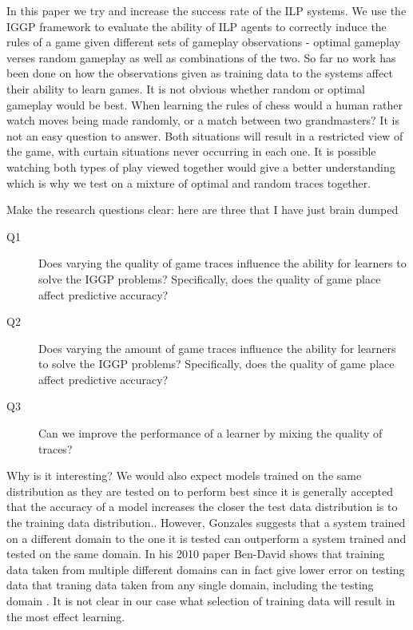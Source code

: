 In this paper we try and increase the success rate of the ILP systems. We use the IGGP framework to evaluate the ability of ILP agents to correctly induce the rules of a game given different sets of gameplay observations - optimal gameplay verses random gameplay as well as combinations of the two. So far no work has been done on how the observations given as training data to the systems affect their ability to learn games. It is not obvious whether random or optimal gameplay would be best. When learning the rules of chess would a human rather watch moves being made randomly, or a match between two grandmasters? It is not an easy question to answer. Both situations will result in a restricted view of the game, with curtain situations never occurring in each one. It is possible watching both types of play viewed together would give a better understanding which is why we test on a mixture of optimal and random traces together.

\ac{Make the research questions clear: here are three that I have just brain dumped}

\begin{description}
\item[Q1] Does varying the quality of game traces influence the ability for learners to solve the IGGP problems? Specifically, does the quality of game place affect predictive accuracy?
\item[Q2] Does varying the amount of game traces influence the ability for learners to solve the IGGP problems? Specifically, does the quality of game place affect predictive accuracy?
\item[Q3] Can we improve the performance of a learner by mixing the quality of traces?
\end{description}

\ac{Why is it interesting?}
We would also expect models trained on the same distribution as they are tested on to perform best since it is generally accepted that the accuracy of a model increases the closer the test data distribution is to the training data distribution.\cite{Mitchell/MachineLearing}. However, Gonzales \cite{Gonzalez/MismatchedOutperform} suggests that a system trained on a different domain to the one it is tested can outperform a system trained and tested on the same domain. In his 2010 paper Ben-David shows that training data taken from multiple different domains can in fact give lower error on testing data that traning data taken from any single domain, including the testing domain \cite{Ben-David/DifferentDomains}. It is not clear in our case what selection of training data will result in the most effect learning.


